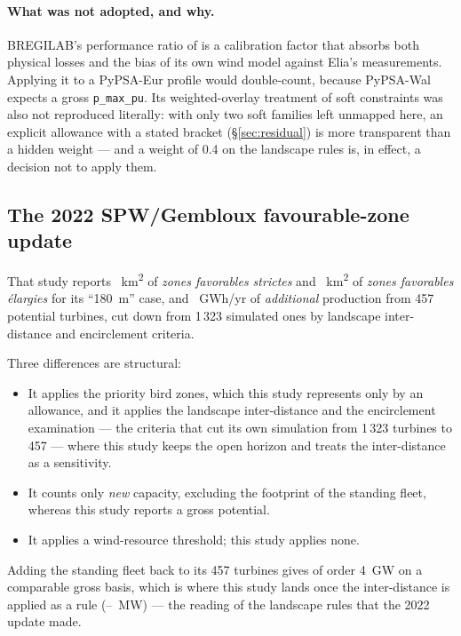 \documentclass[11pt,a4paper]{article}
\begin{document}
\paragraph{What was not adopted, and why.} BREGILAB's performance ratio of
\BregPerf{} is a calibration factor that absorbs both physical losses and the
bias of its own wind model against Elia's measurements. Applying it to a
PyPSA-Eur profile would double-count, because PyPSA-Wal expects a gross
\texttt{p\_max\_pu}. Its weighted-overlay treatment of soft constraints was also
not reproduced literally: with only two soft families left unmapped here, an
explicit allowance with a stated bracket (§\ref{sec:residual}) is more
transparent than a hidden weight --- and a weight of 0.4 on the landscape rules
is, in effect, a decision not to apply them.

\subsection{The 2022 SPW/Gembloux favourable-zone update}

That study reports \SpwStrictArea{}~\si{\square\kilo\metre} of \emph{zones
favorables strictes} and \SpwEnlargedArea{}~\si{\square\kilo\metre} of
\emph{zones favorables élargies} for its ``180~m'' case, and \SpwNewGWh{}~GWh/yr
of \emph{additional} production from 457 potential turbines, cut down from 1\,323
simulated ones by landscape inter-distance and encirclement criteria.

Three differences are structural:

\begin{itemize}
  \item It applies the priority bird zones, which this study represents only
    by an allowance, and it applies the landscape inter-distance and the
    encirclement examination --- the criteria that cut its own simulation from
    1\,323 turbines to 457 --- where this study keeps the open horizon and treats
    the inter-distance as a sensitivity.
  \item It counts only \emph{new} capacity, excluding the footprint of the
    standing fleet, whereas this study reports a gross potential.
  \item It applies a wind-resource threshold; this study applies none.
\end{itemize}

Adding the standing fleet back to its 457 turbines gives of order
\SI{4}{\giga\watt} on a comparable gross basis, which is where this study lands
once the inter-distance is applied as a rule (\InterdistLow{}--\InterdistHigh{}~MW)
--- the reading of the landscape rules that the 2022 update made.
\end{document}

